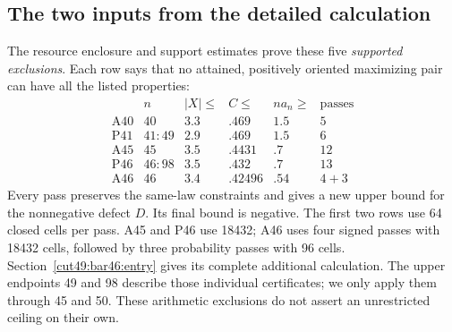 \documentclass[11pt,a4paper]{article}
\numberwithin{equation}{section}
\theoremstyle{definition}
\theoremstyle{remark}
\begin{document}
\subsection{The two inputs from the detailed calculation}
The resource enclosure and support estimates prove these five
\emph{supported exclusions}. Each row says that no attained, positively
oriented maximizing pair can have all the listed properties:
\begin{equation}\label{cut49:global:finitecontracts}
\begin{array}{l|c|c|c|c|r}
 &n&|X|\le&C\le&na_n\ge&\text{passes}\\\hline
\mathrm{A40}&40&3.3&.469&1.5&5\\
\mathrm{P41}&41\!:\!49&2.9&.469&1.5&6\\
\mathrm{A45}&45&3.5&.4431&.7&12\\
\mathrm{P46}&46\!:\!98&3.5&.432&.7&13\\
\mathrm{A46}&46&3.4&.42496&.54&4+3
\end{array}
\end{equation}
Every pass preserves the same-law constraints and gives a new upper
bound for the nonnegative defect $D$. Its final bound is negative.
The first two rows use 64 closed cells per pass. A45 and P46 use
18432; A46 uses four signed passes with 18432 cells, followed by
three probability passes with 96 cells. Section~\ref{cut49:bar46:entry}
gives its complete additional calculation.
The upper endpoints 49 and 98 describe those individual certificates;
we only apply them through 45 and 50. These arithmetic exclusions do
not assert an unrestricted ceiling on their own.
\end{document}
